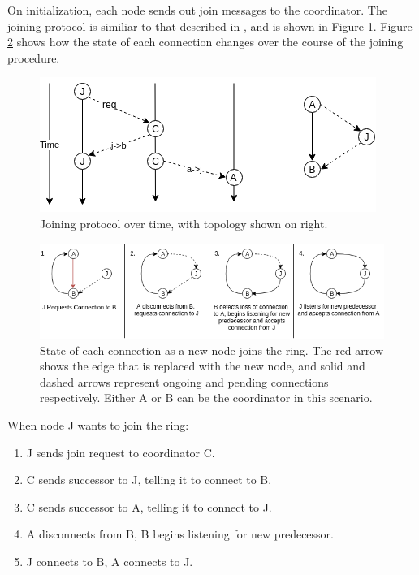 \documentclass[12pt]{article}
\begin{document}
On initialization, each node sends out join messages to the coordinator. The
joining protocol is similiar to that described in \cite{join}, and is shown in Figure \ref{fig:join}.
Figure \ref{fig:bigjoin} shows how the state of each connection changes over the course of
the joining procedure.

\begin{figure}[!ht]
\centering
  \centering
  \includegraphics[width=.6\linewidth]{images/join}
  \caption{Joining protocol over time, with topology shown on right.}
\label{fig:join}
\end{figure}

\begin{figure}[!ht]
  \centering
  \includegraphics[width=\linewidth]{images/bigflow}
  \caption{State of each connection as a new node joins the ring. The red arrow
shows the edge that is replaced with the new node, and solid and dashed
arrows represent ongoing and pending connections respectively. Either A or
B can be the coordinator in this scenario.}
\label{fig:bigjoin}
\end{figure}
\FloatBarrier

\noindent When node J wants to join the ring:
\begin{enumerate}
    \item J sends join request to coordinator C.
    \item C sends successor to J, telling it to connect to B.
    \item C sends successor to A, telling it to connect to J. 
    \item A disconnects from B, B begins listening for new predecessor.
    \item J connects to B, A connects to J.
\end{enumerate}
\end{document}
